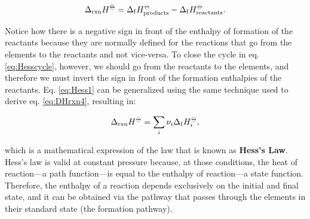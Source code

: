 \documentclass[
  9pt,
]{extbook}
\theoremstyle{definition}
\theoremstyle{definition}
\theoremstyle{definition}
\theoremstyle{remark}
\begin{document}
\begin{equation}
  \Delta_{\text{rxn}} H^{-\kern-6pt{\ominus}\kern-6pt-}= \Delta_{\mathrm{f}} H_{\text{products}}^{-\kern-6pt{\ominus}\kern-6pt-}- \Delta_{\mathrm{f}} H_{\text{reactants}}^{-\kern-6pt{\ominus}\kern-6pt-}.
  \label{eq:Hess1}
\end{equation}

Notice how there is a negative sign in front of the enthalpy of formation of the reactants because they are normally defined for the reactions that go from the elements to the reactants and not vice-versa. To close the cycle in eq. \eqref{eq:Hesscycle}, however, we should go from the reactants to the elements, and therefore we must invert the sign in front of the formation enthalpies of the reactants. Eq. \eqref{eq:Hess1} can be generalized using the same technique used to derive eq. \eqref{eq:DHrxn4}, resulting in:

\begin{equation}
  \Delta_{\text{rxn}} H^{-\kern-6pt{\ominus}\kern-6pt-}= \sum_i \nu_i \Delta_{\mathrm{f}} H_i^{-\kern-6pt{\ominus}\kern-6pt-},
  \label{eq:Hess}
\end{equation}

which is a mathematical expression of the law that is known as \textbf{Hess's Law}. Hess's law is valid at constant pressure because, at those conditions, the heat of reaction---a path function---is equal to the enthalpy of reaction---a state function. Therefore, the enthalpy of a reaction depends exclusively on the initial and final state, and it can be obtained via the pathway that passes through the elements in their standard state (the formation pathway).
\end{document}
